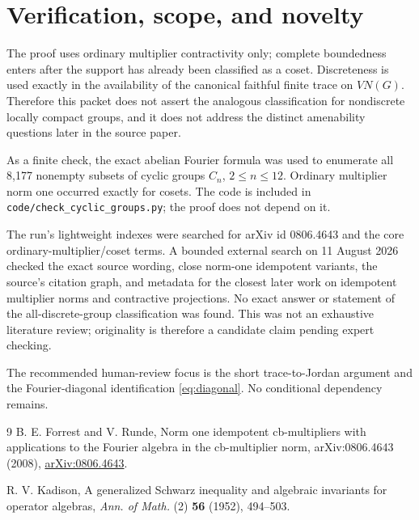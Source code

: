 \documentclass[11pt]{article}
\begin{document}
\section{Verification, scope, and novelty}

The proof uses ordinary multiplier contractivity only; complete boundedness
enters after the support has already been classified as a coset.  Discreteness
is used exactly in the availability of the canonical faithful finite trace on
$VN(G)$.  Therefore this packet does not assert the analogous classification
for nondiscrete locally compact groups, and it does not address the distinct
amenability questions later in the source paper.

As a finite check, the exact abelian Fourier formula was used to enumerate all
8,177 nonempty subsets of cyclic groups $C_n$, $2\le n\le12$.  Ordinary
multiplier norm one occurred exactly for cosets.  The code is included in
\texttt{code/check\_cyclic\_groups.py}; the proof does not depend on it.

The run's lightweight indexes were searched for arXiv id 0806.4643 and the
core ordinary-multiplier/coset terms.  A bounded external search on 11 August
2026 checked the exact source wording, close norm-one idempotent variants,
the source's citation graph, and metadata for the closest later work on
idempotent multiplier norms and contractive projections.  No exact answer or
statement of the all-discrete-group classification was found.  This was not
an exhaustive literature review; originality is therefore a candidate claim
pending expert checking.

The recommended human-review focus is the short trace-to-Jordan argument and
the Fourier-diagonal identification \eqref{eq:diagonal}.  No conditional
dependency remains.

\enlargethispage{3\baselineskip}
{\small
\begin{thebibliography}{9}
B. E. Forrest and V. Runde,
\newblock Norm one idempotent cb-multipliers with applications to the Fourier
algebra in the cb-multiplier norm,
\newblock arXiv:0806.4643 (2008),
\href{https://arxiv.org/abs/0806.4643}{arXiv:0806.4643}.

R. V. Kadison,
\newblock A generalized Schwarz inequality and algebraic invariants for
operator algebras,
\newblock \emph{Ann. of Math.} (2) \textbf{56} (1952), 494--503.
\end{thebibliography}
}
\end{document}
